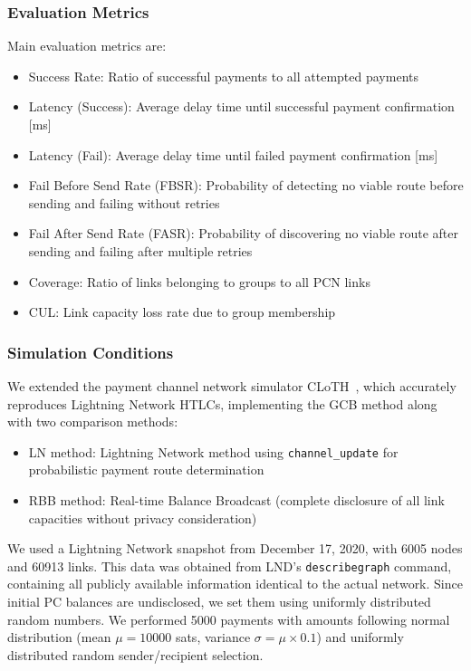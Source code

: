 \documentclass[conference]{IEEEtran}
\newcommand{\channelupdate}{\texttt{channel\_update}}
\begin{document}
\subsubsection{Evaluation Metrics}

Main evaluation metrics are:
\begin{itemize}
	\item Success Rate: Ratio of successful payments to all attempted payments
	\item Latency (Success): Average delay time until successful payment confirmation [ms]
	\item Latency (Fail): Average delay time until failed payment confirmation [ms]
	\item Fail Before Send Rate (FBSR): Probability of detecting no viable route before sending and failing without retries
	\item Fail After Send Rate (FASR): Probability of discovering no viable route after sending and failing after multiple retries
	\item Coverage: Ratio of links belonging to groups to all PCN links
	\item CUL: Link capacity loss rate due to group membership
\end{itemize}

\subsubsection{Simulation Conditions}

We extended the payment channel network simulator CLoTH~\cite{CONOSCENTI2021100717}, which accurately reproduces Lightning Network HTLCs, implementing the GCB method along with two comparison methods:
\begin{itemize}
	\item LN method: Lightning Network method using \channelupdate{} for probabilistic payment route determination
	\item RBB method: Real-time Balance Broadcast (complete disclosure of all link capacities without privacy consideration)
\end{itemize}

We used a Lightning Network snapshot from December 17, 2020, with 6005 nodes and 60913 links. This data was obtained from LND's \texttt{describegraph} command, containing all publicly available information identical to the actual network. Since initial PC balances are undisclosed, we set them using uniformly distributed random numbers. We performed 5000 payments with amounts following normal distribution (mean $\mu = 10000$ sats, variance $\sigma = \mu \times 0.1$) and uniformly distributed random sender/recipient selection.
\end{document}
